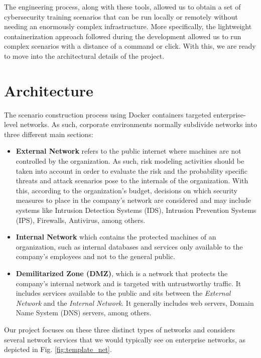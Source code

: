 The engineering process, along with these tools, allowed us to obtain a set of cybersecurity training scenarios that can be run locally or remotely without needing an enormously complex infrastructure. More specifically, the lightweight containerization approach followed during the development allowed us to run complex scenarios with a distance of a command or click. With this, we are ready to move into the architectural details of the project.

\section{Architecture} \label{sec:validation_architecture}

The scenario construction process using Docker containers targeted enterprise-level networks. As such, corporate environments normally subdivide networks into three different main sections:

\begin{itemize}
    \item \textbf{External Network} refers to the public internet where machines are not controlled by the organization. As such, risk modeling activities should be taken into account in order to evaluate the risk and the probability specific threats and attack scenarios pose to the internals of the organization. With this, according to the organization's budget, decisions on which security measures to place in the company's network are considered and may include systems like Intrusion Detection Systems (IDS), Intrusion Prevention Systems (IPS), Firewalls, Antivirus, among others.
    \item \textbf{Internal Network} which contains the protected machines of an organization, such as internal databases and services only available to the company's employees and not to the general public.
    \item \textbf{Demilitarized Zone (DMZ)}, which is a network that protects the company's internal network and is targeted with untrustworthy traffic. It includes services available to the public and sits between the \textit{External Network} and the \textit{Internal Network}. It generally includes web servers, Domain Name System (DNS) servers, among others.
\end{itemize}

Our project focuses on these three distinct types of networks and considers several network services that we would typically see on enterprise networks, as depicted in Fig. \ref{fig:template_net}.

